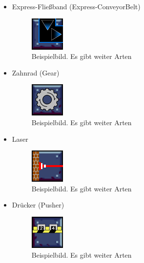 \documentclass[12pt,a4paper,oneside]{book}
\theoremstyle{plain}
\numberwithin{equation}{chapter} \DeclareMathOperator{\Var}{Var}
\begin{document}
\begin{itemize}
    \item Express-Fließband (Express-ConveyorBelt)
    \begin{itemize}
        \begin{figure}[h]
            \centering
            \includegraphics{assets/ExpressConveyorBelt/ExpressConveyorBelt23.png}
            \caption*{Beispielbild. Es gibt weiter Arten}
            \label{ConveyorBelt}
        \end{figure}
    \end{itemize}
    
    \newpage
    \item Zahnrad (Gear)
    \begin{itemize}
        \begin{figure}[h]
            \centering
            \includegraphics{assets/Gear/Gear01.png}
            \caption*{Beispielbild. Es gibt weiter Arten}
            \label{ConveyorBelt}
        \end{figure}
    \end{itemize}
    
    \item Laser
    \begin{itemize}
        \begin{figure}[h]
            \centering
            \includegraphics{assets/Laser/Laser00.png}
            \caption*{Beispielbild. Es gibt weiter Arten}
            \label{ConveyorBelt}
        \end{figure}
    \end{itemize}
    
    \item Drücker (Pusher)
    \begin{itemize}
        \begin{figure}[h]
            \centering
            \includegraphics{assets/Pusher/Pusher01.png}
            \caption*{Beispielbild. Es gibt weiter Arten}
            \label{ConveyorBelt}
        \end{figure}
    \end{itemize}
    

\end{itemize}
\end{document}
